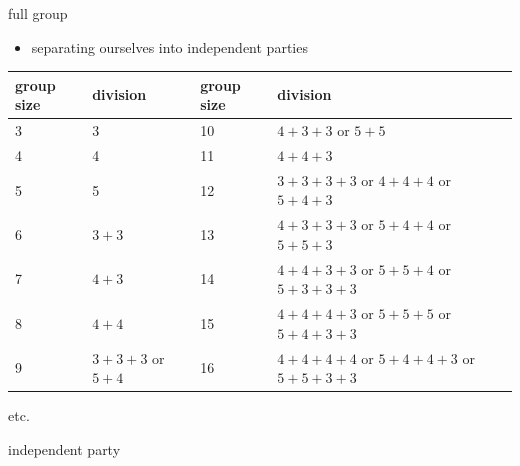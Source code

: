 \documentclass[12pt,a4paper,ngerman]{article}
\begin{document}
\vspace{1.5cm}



\hspace{1.5cm} {\large full group} \hfill

\begin{itemize}

    \item{separating ourselves into independent parties}

\end{itemize}


\vspace{0.15cm}

\hspace{0.5cm} \begin{minipage}[b]{.8\textwidth}


    \footnotesize


    \begin{tabular}{l l || l l} 
        group size & division & group size & division \\ [0.5ex] 
        \hline
        3 & 3 & 10 & $4+3+3$ or $5+5$\\
        4 & 4 & 11 & $4+4+3$\\
        5 & 5 & 12 & $3+3+3+3$ or $4+4+4$ or $5+4+3$\\
        6 & $3+3$ & 13 & $4+3+3+3$ or $5+4+4$ or $5+5+3$\\
        7 & $4+3$ & 14 & $4+4+3+3$ or $5+5+4$ or $5+3+3+3$\\
        8 & $4+4$ & 15 & $4+4+4+3$ or $5+5+5$ or $5+4+3+3$\\
        9 & $3+3+3$ or $5+4$ & 16 & $4+4+4+4$ or $5+4+4+3$ or $5+5+3+3$\\
    \end{tabular}
    
\end{minipage}%

\vspace{0.3cm}

\hspace{+5.5cm} \footnotesize etc.

\vspace{1cm}


\hspace{1.5cm} {\large independent party} \hfill
\end{document}
